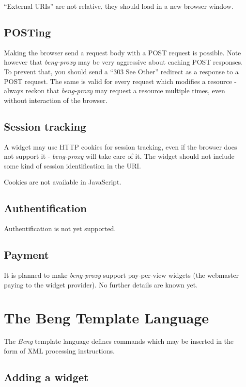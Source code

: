 \documentclass[a4paper,12pt]{article}
\begin{document}
``External URIs'' are not relative, they should
load in a new browser window.

\subsection{POSTing}

Making the browser send a request body with a POST request is
possible.  Note however that \emph{beng-proxy} may be very aggressive
about caching POST responses.  To prevent that, you should send a
``303 See Other'' redirect as a response to a POST request.  The same
is valid for every request which modifies a resource - always reckon
that \emph{beng-proxy} may request a resource multiple times, even
without interaction of the browser.

\subsection{Session tracking}

A widget may use HTTP cookies for session tracking, even if the
browser does not support it - \emph{beng-proxy} will take care of it.
The widget should not include some kind of session identification in
the URI.

Cookies are not available in JavaScript.

\subsection{Authentification}

Authentification is not yet supported.

\subsection{Payment}

It is planned to make \emph{beng-proxy} support pay-per-view widgets
(the webmaster paying to the widget provider).  No further details are
known yet.


\section{The Beng Template Language}

The \emph{Beng} template language defines commands which may be
inserted in the form of XML processing instructions.

\subsection{Adding a widget}
\end{document}
